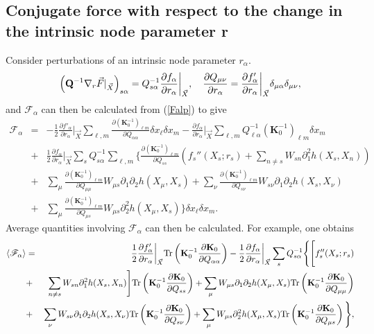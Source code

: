 \subsection{Conjugate force with respect to the change in the intrinsic node parameter r}
\quad Consider perturbations of an intrinsic node parameter $r_\alpha$.
\begin{equation}
    \left({\bf Q}^{-1} \nabla_r{\vec {F}}|_{\vec X} \right)_{s\alpha} =
    Q_{s\alpha}^{-1}\frac{\partial f_\alpha}{\partial r_\alpha} \bigg|_{\vec X},\quad
    \frac{\partial Q_{\mu\nu}}{\partial r_\alpha}=\frac{\partial f'_\alpha}{\partial r_\alpha}\bigg|_{\vec X}\delta_{\mu\alpha}\delta_{\mu\nu},\label{QgradF}
\end{equation}
and ${\mathscr F}_\alpha$  can then be calculated from (\ref{Falp}) to give
\begin{eqnarray}
    {\mathscr F}_\alpha&=& -\frac{1}{2} \frac{\partial f'_\alpha}{\partial r_\alpha}\Bigg|_{\vec{X}} \sum_{\ell,m} \frac{\partial (\mathbf{K}_0^{-1})_{\ell m}}{\partial Q_{\alpha\alpha}} \delta x_\ell \delta x_m - \frac{\partial f_\alpha}{\partial r_\alpha}\Bigg|_{\vec{X}} \sum_{\ell,m} Q^{-1}_{\ell\alpha} (\mathbf{K}_0^{-1})_{\ell m} \delta x_m\\
    &+&\frac{1}{2}\frac{\partial f_\alpha}{\partial r_\alpha}\Bigg|_{\vec{X}} \sum_s {Q}^{-1}_{s\alpha} \sum_{\ell,m} \Bigg\{ \frac{\partial (\mathbf{K}_0^{-1})_{\ell m}}{\partial Q_{ss}}\left( f_s''(X_s;r_s)+\sum_{n\neq s} W_{sn} \partial^2_1 h(X_s, X_n) \right)\nonumber\\
    &+& \sum_\mu \frac{\partial (\mathbf{K}_0^{-1})_{\ell m}}{\partial Q_{\mu\mu}} W_{\mu s} \partial_1 \partial_2 h(X_\mu, X_s) + \sum_\nu \frac{\partial (\mathbf{K}_0^{-1})_{\ell m}}{\partial Q_{s\nu}} W_{s\nu}\partial_1\partial_2 h(X_s,X_\nu)\nonumber\\ &+& \sum_\mu \frac{\partial (\mathbf{K}_0^{-1})_{\ell m}}{\partial Q_{\mu s}} W_{\mu s} \partial^2_2 h(X_\mu, X_s) \Bigg\} \delta x_\ell \delta x_m .\nonumber
\end{eqnarray}
Average quantities involving ${\mathscr F}_\alpha$ can then be calculated. For example, one obtains
\begin{eqnarray}
\langle{{\mathscr F}_\alpha}\rangle&=& \frac{1}{2} \frac{\partial f'_\alpha}{\partial r_\alpha}\bigg|_{\vec X} \text{Tr}\left({\bf K}_0^{-1} \frac{\partial {\bf K}_0} {\partial Q_{\alpha\alpha}}\right)-\frac{1}{2}\frac{\partial f_\alpha}{\partial r_\alpha} \bigg|_{\vec X} \sum_s Q_{s\alpha}^{-1}\Bigg\{ \Bigg[ f_s''(X_s;r_s)\\
&+&\sum_{n\neq s} W_{sn} \partial^2_1 h(X_s, X_n) \Bigg] \text{Tr}\left({\bf K}_0^{-1} \frac{\partial {\bf K}_0} {\partial Q_{ss}}\right)+\sum_\mu W_{\mu s} \partial_1 \partial_2 h(X_\mu, X_s) \text{Tr}\left({\bf K}_0^{-1} \frac{\partial {\bf K}_0} {\partial Q_{\mu\mu}}\right)\nonumber\\
&+& \sum_\nu W_{s\nu}\partial_1\partial_2 h(X_s,X_\nu) \text{Tr}\left({\bf K}_0^{-1} \frac{\partial {\bf K}_0} {\partial Q_{s\nu}}\right)+ \sum_\mu W_{\mu s} \partial^2_2 h(X_\mu, X_s) \text{Tr}\left({\bf K}_0^{-1} \frac{\partial {\bf K}_0} {\partial Q_{\mu s}}\right) \Bigg\},\nonumber
\end{eqnarray}
